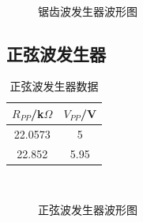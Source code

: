 \documentclass[a4paper]{article}
\begin{document}
\begin{figure}[!h]
\centering
{}\qquad
{}\\
\caption{锯齿波发生器波形图}\label{datafig4}
\end{figure}
\subsection{正弦波发生器}%
\begin{table}[!h]
\centering
\caption{正弦波发生器数据}
\label{data5}
\begin{tabular}{|c|c|}
\hline
$R_{PP}$/k$\Omega$ & $V_{PP}$/V \\ \hline
22.0573            & 5          \\ \hline
22.852             & 5.95       \\ \hline
\end{tabular}
\end{table}
\begin{figure}[!h]
\centering
{}\qquad
{}\\
\caption{正弦波发生器波形图}\label{datafig5}
\end{figure}
\end{document}

